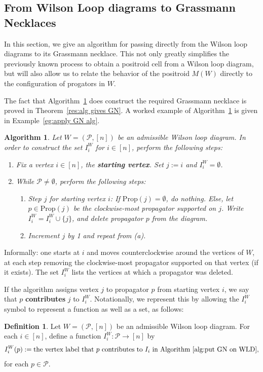 \documentclass[11pt]{article}
\newcommand{\cP}{\mathcal{P}}
\newcommand{\Prop}{\textrm{Prop}}
\newtheorem{algorithm}[thm]{Algorithm}
\theoremstyle{remark}
\theoremstyle{definition}
\newtheorem{dfn}[thm]{Definition}
\begin{document}
\subsection{From Wilson Loop diagrams to Grassmann Necklaces}\label{sec:GN alg}

In this section, we give an algorithm for passing directly from the Wilson loop diagrams to its Grassmann necklace. This not only greatly simplifies the previously known process to obtain a positroid cell from a Wilson loop diagram, but will also allow us to relate the behavior of the positroid $M(W)$ directly to the configuration of progators in $W$.

The fact that Algorithm~\ref{alg:put GN on WLD} does construct the required Grassmann necklace is proved in Theorem~\ref{res:alg gives GN}. A worked example of Algorithm~\ref{alg:put GN on WLD} is given in Example~\ref{eg:apply GN alg}.

\begin{algorithm}\label{alg:put GN on WLD}
Let $W = (\cP, [n])$ be an admissible Wilson loop diagram. In order to construct the set $I_i^W$ for $i \in [n]$, perform the following steps:

\begin{enumerate}
\item Fix a vertex $i \in [n]$, the {\bf starting vertex}. Set $j:=i$ and $I_i^W = \emptyset$.
\item While $\cP \neq \emptyset$, perform the following steps:
\begin{enumerate}
\item {\em Step $j$ for starting vertex $i$}: If $\Prop(j) = \emptyset$, do nothing. Else, let $p \in \Prop(j)$ be the clockwise-most propagator supported on $j$. Write $I_i^W = I_i^W\cup \{j\}$, and delete propagator $p$ from the diagram.
\item Increment $j$ by 1 and repeat from (a).
\end{enumerate}
\end{enumerate}
\end{algorithm}

Informally: one starts at $i$ and moves counterclockwise around the vertices of $W$, at each step removing the clockwise-most propagator supported on that vertex (if it exists). The set $I_i^W$ lists the vertices at which a propagator was deleted. 


If the algorithm assigns vertex $j$ to propagator $p$ from starting vertex $i$, we say that $p$ \textbf{contributes} $j$ to $I_i^W$. Notationally, we represent this by allowing the $I_i^W$ symbol to represent a function as well as a set, as follows:
\begin{dfn}\label{def I_i as a function}
Let $W = (\cP, [n])$ be an admissible Wilson loop diagram. For each $i \in [n]$, define a function $I_i^W : \cP \longrightarrow [n]$ by
\[I_i^W(p) := \text{the vertex label that $p$ contributes to $I_i$ in Algorithm~\ref{alg:put GN on WLD},}\]
for each $p \in \cP$. 
\end{dfn}
\end{document}
